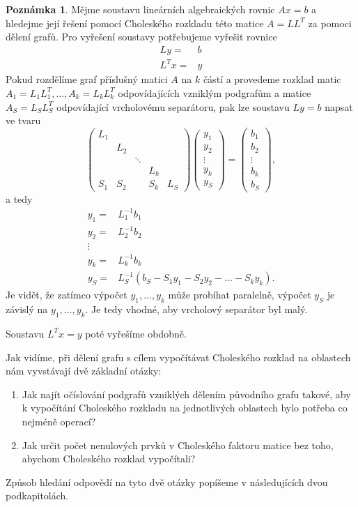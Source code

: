 \documentclass[11pt,american,czech,oneside]{book}
\theoremstyle{plain}
\theoremstyle{definition}
\newtheorem{remark}{Poznámka}
\begin{document}
\begin{remark}
Mějme soustavu lineárních algebraických rovnic $Ax=b$ a hledejme její řešení pomocí Choleského rozkladu této matice $A=LL^T$ za pomoci dělení grafů. Pro vyřešení soustavy potřebujeme vyřešit rovnice
\begin{align*}
  Ly =& b \\
  L^Tx= & y
\end{align*}
Pokud rozdělíme graf příslušný matici $A$ na $k$ částí a provedeme rozklad matic $A_1=L_1 L_1^T, \ldots, A_k=L_k L_k^T$ odpovídajících vzniklým podgrafům a matice $A_S=L_S L_S^T$ odpovídající vrcholovému separátoru, pak lze soustavu $Ly=b$ napsat ve tvaru
\[
\begin{pmatrix}
  L_1 &     &        &      & \\
      & L_2 &        &      & \\
      &     & \ddots &      & \\
      &     &        & L_k  & \\
  S_1 & S_2 &        & S_k  & L_S
\end{pmatrix}
\begin{pmatrix}
  y_1 \\
  y_2 \\
  \vdots \\
  y_k \\
  y_S
\end{pmatrix}
=
\begin{pmatrix}
  b_1 \\
  b_2 \\
  \vdots \\
  b_k \\
  b_S
\end{pmatrix},
\]
a tedy
\begin{align*}
  y_1= & L_1^{-1}b_1 \\
  y_2= & L_2^{-1}b_2 \\
  \vdots \\
  y_k= & L_k^{-1}b_k \\
  y_S= & L_S^{-1}(b_S - S_1 y_1 - S_2 y_2 - \ldots - S_k y_k).
\end{align*}
Je vidět, že zatímco výpočet $y_1, \ldots, y_k$ může probíhat paralelně, výpočet $y_S$ je závislý na $y_1, \ldots, y_k$. Je tedy vhodné, aby vrcholový separátor byl malý.


Soustavu $L^Tx=y$ poté vyřešíme obdobně.
\end{remark}

\medskip

Jak vidíme, při dělení grafu s cílem vypočítávat Choleského rozklad na oblastech nám vyvstávají dvě základní otázky:
\begin{enumerate}
  \item Jak najít očíslování podgrafů vzniklých dělením původního grafu takové, aby k vypočítání Choleského rozkladu na jednotlivých oblastech bylo potřeba co nejméně operací?
  \item Jak určit počet nenulových prvků v Choleského faktoru matice bez toho, abychom Choleského rozklad vypočítali?
\end{enumerate}
Způsob hledání odpovědí na tyto dvě otázky popíšeme v následujících dvou podkapitolách.
\end{document}
